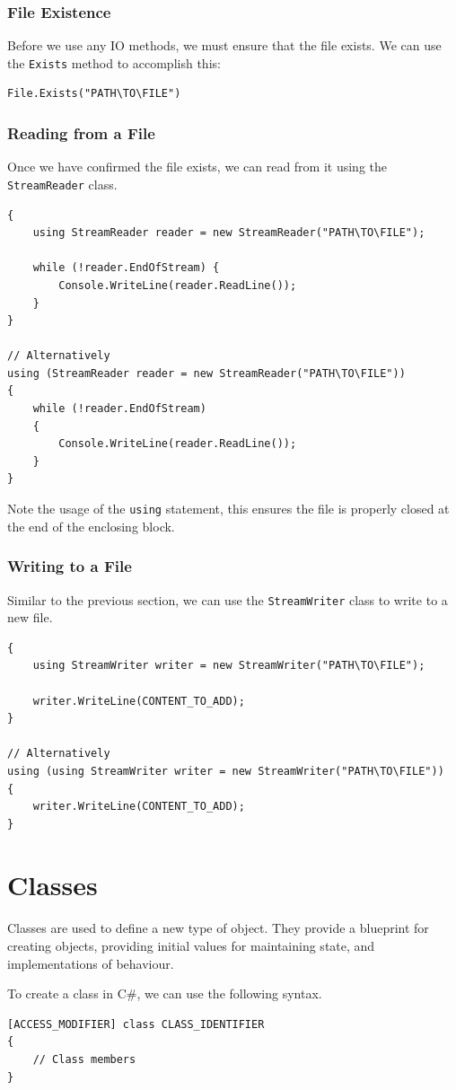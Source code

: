 \documentclass{article}
\begin{document}
\subsubsection{File Existence}
Before we use any IO methods, we must ensure that the file exists.
We can use the \lstinline{Exists} method to accomplish this:
\begin{lstlisting}[numbers=none]
File.Exists("PATH\TO\FILE")
\end{lstlisting}
\subsubsection{Reading from a File}
Once we have confirmed the file exists, we can read from it using the \lstinline{StreamReader} class.
\begin{lstlisting}[numbers=none]
{
    using StreamReader reader = new StreamReader("PATH\TO\FILE");

    while (!reader.EndOfStream) {
        Console.WriteLine(reader.ReadLine());
    }
}

// Alternatively
using (StreamReader reader = new StreamReader("PATH\TO\FILE"))
{
    while (!reader.EndOfStream)
    {
        Console.WriteLine(reader.ReadLine());
    }
}
\end{lstlisting}
Note the usage of the \lstinline{using} statement, this ensures the file is properly closed at the end
of the enclosing block.
\subsubsection{Writing to a File}
Similar to the previous section, we can use the \lstinline{StreamWriter} class to write to a new file.
\begin{lstlisting}[numbers=none]
{
    using StreamWriter writer = new StreamWriter("PATH\TO\FILE");

    writer.WriteLine(CONTENT_TO_ADD);
}

// Alternatively
using (using StreamWriter writer = new StreamWriter("PATH\TO\FILE"))
{
    writer.WriteLine(CONTENT_TO_ADD);
}
\end{lstlisting}
\section{Classes}
Classes are used to define a new type of object. They provide a blueprint for creating objects,
providing initial values for maintaining state, and implementations of behaviour.

To create a class in C\#, we can use the following syntax.
\begin{lstlisting}[numbers=none]
[ACCESS_MODIFIER] class CLASS_IDENTIFIER 
{
    // Class members
}     
\end{lstlisting}
\end{document}
